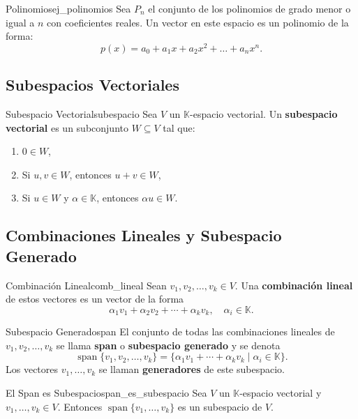 \documentclass[11pt, a4paper]{article}
\begin{document}
\begin{ejemplo}{Polinomios}{ej_polinomios}
Sea $P_n$ el conjunto de los polinomios de grado menor o igual a $n$ con coeficientes reales.
Un vector en este espacio es un polinomio de la forma:
\[
p(x) = a_0 + a_1 x + a_2 x^2 + \dots + a_n x^n.
\]
\end{ejemplo}

\subsection{Subespacios Vectoriales}

\begin{definicion}{Subespacio Vectorial}{subespacio}
Sea $V$ un $\mathbb{K}$-espacio vectorial. Un \textbf{subespacio vectorial} es un subconjunto $W \subseteq V$ tal que:
\begin{enumerate}
    \item $0 \in W$,
    \item Si $u,v \in W$, entonces $u+v \in W$,
    \item Si $u \in W$ y $\alpha \in \mathbb{K}$, entonces $\alpha u \in W$.
\end{enumerate}
\end{definicion}

\subsection{Combinaciones Lineales y Subespacio Generado}

\begin{definicion}{Combinación Lineal}{comb_lineal}
Sean $v_1,v_2,\dots,v_k \in V$. Una \textbf{combinación lineal} de estos vectores es un vector de la forma
\[
\alpha_1 v_1 + \alpha_2 v_2 + \cdots + \alpha_k v_k,
\quad \alpha_i \in \mathbb{K}.
\]
\end{definicion}

\begin{definicion}{Subespacio Generado}{span}
El conjunto de todas las combinaciones lineales de $v_1,v_2,\dots,v_k$ se llama \textbf{span} o \textbf{subespacio generado} y se denota
\[
\operatorname{span}\{v_1,v_2,\dots,v_k\}
= \{ \alpha_1 v_1 + \cdots + \alpha_k v_k \mid \alpha_i \in \mathbb{K} \}.
\]
Los vectores $v_1,\dots,v_k$ se llaman \textbf{generadores} de este subespacio.
\end{definicion}

\begin{proposicion}{El Span es Subespacio}{span_es_subespacio}
Sea $V$ un $\mathbb{K}$-espacio vectorial y $v_1,\dots,v_k \in V$. Entonces $\operatorname{span}\{v_1,\dots,v_k\}$ es un subespacio de $V$.
\end{proposicion}
\end{document}
